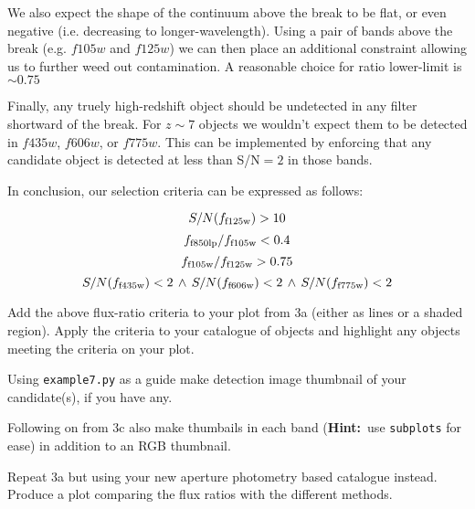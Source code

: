 \documentclass{article}
\newcommand{\hint}{\textbf{Hint:}}
\begin{document}
We also expect the shape of the continuum above the break to be flat, or even negative (i.e. decreasing to longer-wavelength). Using a pair of bands above the break (e.g. $f105w$ and $f125w$) we can then place an additional constraint allowing us to further weed out contamination. A reasonable choice for ratio lower-limit is $\sim 0.75$

Finally, any truely high-redshift object should be undetected in any filter shortward of the break. For $z\sim 7$ objects we wouldn't expect them to be detected in $f435w$, $f606w$, or $f775w$. This can be implemented by enforcing that any candidate object is detected at less than S/N$=2$ in those bands.

In conclusion, our selection criteria can be expressed as follows:

\[
S/N(f_{\rm f125w})>10
\]
\[
f_{\rm f850lp}/f_{\rm f105w}<0.4
\]
\[
f_{\rm f105w}/f_{\rm f125w}>0.75
\]
\[
S/N(f_{\rm f435w})<2\, \land\, S/N(f_{\rm f606w})<2\, \land\, S/N(f_{\rm f775w})<2
\]


\begin{question}
Add the above flux-ratio criteria to your plot from 3a (either as lines or a shaded region). Apply the criteria to your catalogue of objects and highlight any objects meeting the criteria on your plot.
\end{question}


\begin{question}
Using \texttt{example7.py} as a guide make detection image thumbnail of your candidate(s), if you have any.
\end{question}

\begin{question}
Following on from 3c also make thumbails in each band (\hint\ use \texttt{subplots} for ease) in addition to an RGB thumbnail.
\end{question}

\begin{question}
Repeat 3a but using your new aperture photometry based catalogue instead. Produce a plot comparing the flux ratios with the different methods.
\end{question}

\end{document}
